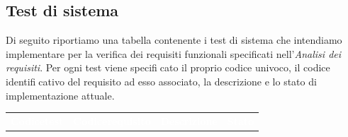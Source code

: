 \subsection{Test di sistema}
Di seguito riportiamo una tabella contenente i test di sistema che intendiamo implementare per la verifica dei requisiti funzionali specificati nell'\emph{Analisi dei requisiti}. Per ogni test viene specificato il proprio codice univoco, il codice identificativo del requisito ad esso associato, la descrizione e lo stato di implementazione attuale.
	\begin{longtable}{|>{\centering\arraybackslash}m{1.6cm}|>{\centering\arraybackslash}m{1.7cm}|m{6.41cm}|>{\centering\arraybackslash}m{3.1cm}|}		
		\rowcolor{LightBlue}
		\textbf{\textcolor{white}{Codice\newline test}}
		& \textbf{\textcolor{white}{Codice\newline requisito}}
		& \multicolumn{1}{|c|}{\textbf{\textcolor{white}{ Descrizione}}}
		& \textbf{\textcolor{white}{Stato}}\\
		

\end{longtable}

